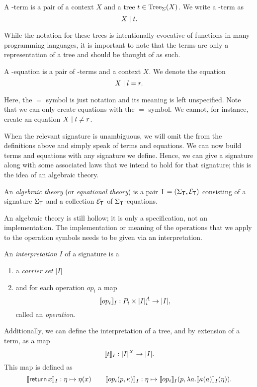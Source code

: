 A \Sig-term is a pair of a context $X$ and a tree $t \in \operatorname{Tree}_\Sigma(X)$. We write a \Sig-term as
\[ X \;|\; t. \]

While the notation for these trees is intentionally evocative of functions in many programming languages, it is important to note that the terms are only a representation of a tree and should be thought of as such.

\begin{definition}
    A \Sig-equation is a pair of \Sig-terms and a context $X$. We denote the equation
    \[ X \;|\; l = r. \]
\end{definition}

Here, the $=$ symbol is just notation and its meaning is left unspecified. Note that we can only create equations with the $=$ symbol. We cannot, for instance, create an equation $X \;|\; l \neq r$.

When the relevant signature \Sig is unambiguous, we will omit the \Sig from the definitions above and simply speak of terms and equations. We can now build terms and equations with any signature we define. Hence, we can give a signature along with some associated laws that we intend to hold for that signature; this is the idea of an algebraic theory.

\begin{definition}
    An \emph{algebraic theory} (or \emph{equational theory}) is a pair $\mathsf{T} = (\Sigma_\mathsf{T}, \mathcal{E}_\mathsf{T})$ consisting of a signature $\Sigma_\mathsf{T}$ and a collection $\mathcal{E}_\mathsf{T}$ of $\Sigma_\mathsf{T}$-equations.
\end{definition}

An algebraic theory is still hollow; it is only a specification, not an implementation. The implementation or meaning of the operations that we apply to the operation symbols needs to be given via an interpretation.

\begin{definition}[Interpretation]
    An \emph{interpretation} $I$ of a signature \Sig is a
    \begin{enumerate}
    \item a \emph{carrier set} $|I|$
    \item and for each operation $op_i$ a map
        \[ \llbracket op_i\rrbracket_I : P_i \times |I|^A_i \to |I|, \]
        called an \emph{operation}.
    \end{enumerate}
    Additionally, we can define the interpretation of a tree, and by extension of a term, as a map
    \[ \llbracket t\rrbracket_I : |I|^X \to |I|. \]
    This map is defined as
    \[
        \llbracket\operatorname{\mathsf{return}} x\rrbracket_I : \eta \mapsto \eta(x)
        \qquad
        \llbracket op_i(p,\kappa)\rrbracket_I : \eta \mapsto \llbracket op_i\rrbracket_I(p, \lambda a. \llbracket\kappa(a)\rrbracket_I(\eta)).
    \]
\end{definition}

